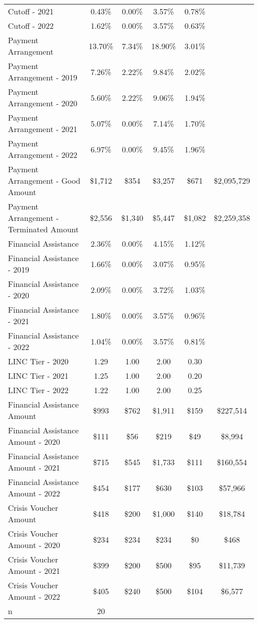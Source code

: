 \begin{tabular}{l|c|c|c|c|c}
\quad Cutoff - 2021 & 0.43\% & 0.00\% & 3.57\% & 0.78\% \\
\quad Cutoff - 2022 & 1.62\% & 0.00\% & 3.57\% & 0.63\% \\
\midrule 
Payment Arrangement & 13.70\% & 7.34\% & 18.90\% & 3.01\% \\
\quad Payment Arrangement - 2019 & 7.26\% & 2.22\% & 9.84\% & 2.02\% \\
\quad Payment Arrangement - 2020 & 5.60\% & 2.22\% & 9.06\% & 1.94\% \\
\quad Payment Arrangement - 2021 & 5.07\% & 0.00\% & 7.14\% & 1.70\% \\
\quad Payment Arrangement - 2022 & 6.97\% & 0.00\% & 9.45\% & 1.96\% \\
\quad Payment Arrangement - Good Amount & \$1,712 & \$354 & \$3,257 & \$671 & \$2,095,729 \\
\quad Payment Arrangement - Terminated Amount & \$2,556 & \$1,340 & \$5,447 & \$1,082 & \$2,259,358 \\
\midrule 
Financial Assistance & 2.36\% & 0.00\% & 4.15\% & 1.12\% \\
\quad Financial Assistance - 2019 & 1.66\% & 0.00\% & 3.07\% & 0.95\% \\
\quad Financial Assistance - 2020 & 2.09\% & 0.00\% & 3.72\% & 1.03\% \\
\quad Financial Assistance - 2021 & 1.80\% & 0.00\% & 3.57\% & 0.96\% \\
\quad Financial Assistance - 2022 & 1.04\% & 0.00\% & 3.57\% & 0.81\% \\
\midrule 
LINC Tier - 2020 & 1.29 & 1.00 & 2.00 & 0.30 \\
LINC Tier - 2021 & 1.25 & 1.00 & 2.00 & 0.20 \\
LINC Tier - 2022 & 1.22 & 1.00 & 2.00 & 0.25 \\
\midrule 
Financial Assistance Amount & \$993 & \$762 & \$1,911 & \$159 & \$227,514 \\
\quad Financial Assistance Amount - 2020 & \$111 & \$56 & \$219 & \$49 & \$8,994 \\
\quad Financial Assistance Amount - 2021 & \$715 & \$545 & \$1,733 & \$111 & \$160,554 \\
\quad Financial Assistance Amount - 2022 & \$454 & \$177 & \$630 & \$103 & \$57,966 \\
\midrule 
Crisis Voucher Amount & \$418 & \$200 & \$1,000 & \$140 & \$18,784 \\
\quad Crisis Voucher Amount - 2020 & \$234 & \$234 & \$234 & \$0 & \$468 \\
\quad Crisis Voucher Amount - 2021 & \$399 & \$200 & \$500 & \$95 & \$11,739 \\
\quad Crisis Voucher Amount - 2022 & \$405 & \$240 & \$500 & \$104 & \$6,577 \\
\midrule 
n & 20 &  &  &  &  \\
\midrule 
\bottomrule 
\end{tabular}
